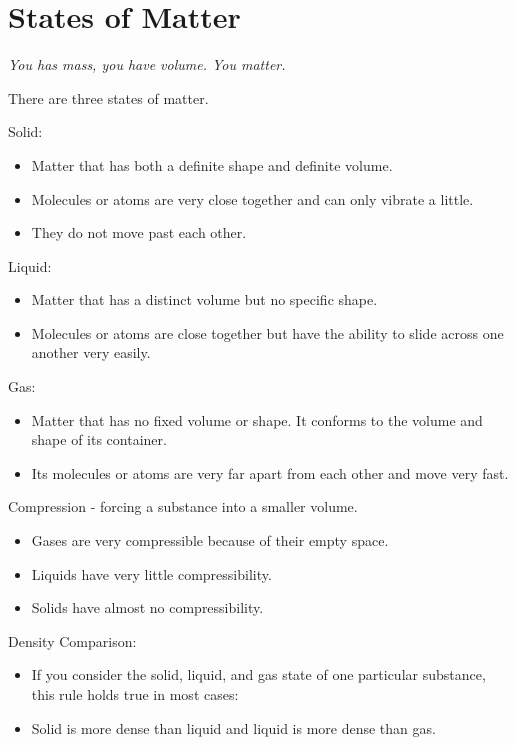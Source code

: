 \documentclass[../hchem.tex]{subfiles}
\begin{document}
\chapter{States of Matter}
\textit{You has mass, you have volume. You matter.}

There are three states of matter.

Solid:
\begin{itemize}
    \item Matter that has both a definite shape and definite volume.
    \item Molecules or atoms are very close together and can only vibrate a little.
    \item They do not move past each other.
\end{itemize}

Liquid:
\begin{itemize}
    \item Matter that has a distinct volume but no specific shape.
    \item Molecules or atoms are close together but have the ability to slide across one another very easily.
\end{itemize}

Gas:
\begin{itemize}
    \item Matter that has no fixed volume or shape. It conforms to the volume and shape of its container.
    \item Its molecules or atoms are very far apart from each other and move very fast.
\end{itemize}

Compression - forcing a substance into a smaller volume.
\begin{itemize}
    \item Gases are very compressible because of their empty space.
    \item Liquids have very little compressibility.
    \item Solids have almost no compressibility.
\end{itemize}

Density Comparison:
\begin{itemize}
    \item If you consider the solid, liquid, and gas state of one particular substance, this rule holds true in most cases:
    \item Solid is more dense than liquid and liquid is more dense than gas.
\end{itemize}
\end{document}
